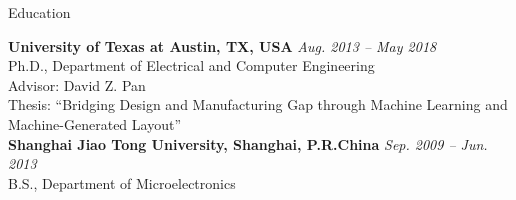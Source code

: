 

\begin{rSection}{Education}


{\bf University of Texas at Austin, TX, USA} \hfill {\em Aug. 2013 -- May 2018} \\ 
Ph.D., Department of Electrical and Computer Engineering \\
Advisor: David Z. Pan \\
Thesis: ``Bridging Design and Manufacturing Gap through Machine Learning and Machine-Generated Layout'' \\

{\bf Shanghai Jiao Tong University, Shanghai, P.R.China} \hfill {\em Sep. 2009 -- Jun. 2013} \\ 
B.S., Department of Microelectronics \\

\end{rSection}

